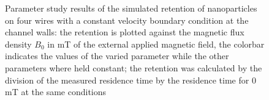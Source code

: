 \begin{figure}[H]
          \caption[Parameter study results of the simulated retention of nanoparticles on four wires with a constant velocity boundary condition at the channel walls]{Parameter study results of the simulated retention of nanoparticles on four wires with a constant velocity boundary condition at the channel walls: the retention is plotted against the magnetic flux density $B_{0}$ in mT of the external applied magnetic field, the colorbar indicates the values of the varied parameter while the other parameters where held constant; the retention was calculated by the division of the measured residence time by the residence time for 0\,mT at the same conditions}
        \label{fig:fw_param_res_constBC}
  \end{figure}
        

        
\begin{figure}
		\centering
            \begin{subfigure}{0.49\textwidth}
                  \flushleft
                  \caption{}\label{subfig:sw_periodicBC_Rw_var}
          \end{subfigure}\hfill
          \\
            \begin{subfigure}{0.49\textwidth}
                  \flushleft

\end{subfigure}
\end{figure}
